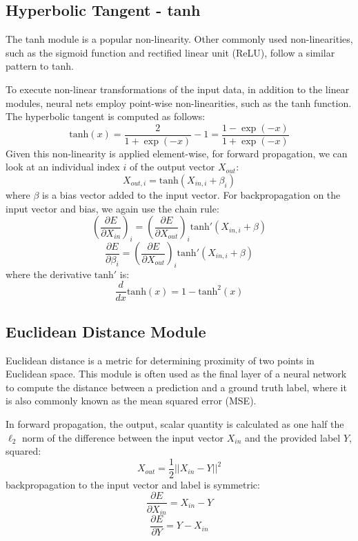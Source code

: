 \subsection{Hyperbolic Tangent - tanh}

The tanh module is a popular non-linearity. Other commonly used non-linearities, such as the sigmoid function and rectified linear unit (ReLU), follow a similar pattern to tanh.

To execute non-linear transformations of the input data, in addition to the linear modules, neural nets employ point-wise non-linearities, such as the tanh function.
The hyperbolic tangent is computed as follows: $$\mathrm{tanh}(x) = \frac{2}{1 + \exp(-x)} - 1 = \frac{1 - \exp(-x)}{1 + \exp(-x)}$$ Given this non-linearity is applied element-wise, for forward propagation, we can look at an individual index $i$ of the output vector $X_{out}$: $$X_{out, i} = \mathrm{tanh}(X_{in, i} + \beta_i)$$ where $\beta$ is a bias vector added to the input vector.
For backpropagation on the input vector and bias, we again use the chain rule: $$\left(\frac{\partial E}{\partial X_{in}}\right)_{i} = \left(\frac{\partial E}{\partial X_{out}}\right)_{i}\mathrm{tanh}'(X_{in, i} + \beta)$$ $$\frac{\partial E}{\partial \beta_i} = \left(\frac{\partial E}{\partial X_{out}}\right)_{i}\mathrm{tanh}'(X_{in, i} + \beta)$$ where the derivative $\mathrm{tanh}'$ is: $$\frac{d}{dx}\mathrm{tanh}(x) = 1 - \mathrm{tanh}^2(x)$$

\subsection{Euclidean Distance Module}

Euclidean distance is a metric for determining proximity of two points in Euclidean space.
This module is often used as the final layer of a neural network to compute the distance between a prediction and a ground truth label, where it is also commonly known as the mean squared error (MSE).

In forward propagation, the output, scalar quantity is calculated as one half the $\ell_2$ norm of the difference between the input vector $X_{in}$ and the provided label $Y$, squared: $$X_{out} = \frac{1}{2}||X_{in} - Y||^2$$ backpropagation to the input vector and label is symmetric: $$\frac{\partial E}{\partial X_{in}} = X_{in} - Y$$ $$\frac{\partial E}{\partial Y} = Y - X_{in}$$

